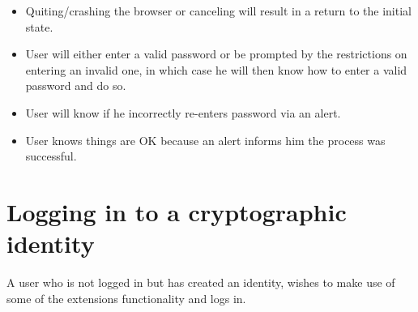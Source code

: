 \begin{desc}
\begin{itemize}
            \item Quiting/crashing the browser or canceling will result in a return to the initial state.
            
            \item User will either enter a valid password or be prompted by the restrictions on entering an invalid one, in which case he will then know how to enter a valid password and do so.
            
            \item User will know if he incorrectly re-enters password via an alert.
            
            \item User knows things are OK because an alert informs him the process was successful.
            
        \end{itemize}
\end{desc}

\section{Logging in to a cryptographic identity}
A user who is not logged in but has created an identity, wishes to make use of some of the extensions functionality and logs in.

